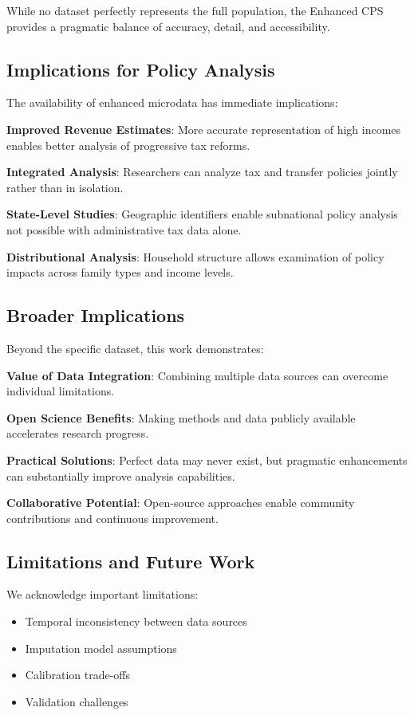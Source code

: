 While no dataset perfectly represents the full population, the Enhanced CPS provides a pragmatic balance of accuracy, detail, and accessibility.

\subsection{Implications for Policy Analysis}

The availability of enhanced microdata has immediate implications:

\textbf{Improved Revenue Estimates}: More accurate representation of high incomes enables better analysis of progressive tax reforms.

\textbf{Integrated Analysis}: Researchers can analyze tax and transfer policies jointly rather than in isolation.

\textbf{State-Level Studies}: Geographic identifiers enable subnational policy analysis not possible with administrative tax data alone.

\textbf{Distributional Analysis}: Household structure allows examination of policy impacts across family types and income levels.

\subsection{Broader Implications}

Beyond the specific dataset, this work demonstrates:

\textbf{Value of Data Integration}: Combining multiple data sources can overcome individual limitations.

\textbf{Open Science Benefits}: Making methods and data publicly available accelerates research progress.

\textbf{Practical Solutions}: Perfect data may never exist, but pragmatic enhancements can substantially improve analysis capabilities.

\textbf{Collaborative Potential}: Open-source approaches enable community contributions and continuous improvement.

\subsection{Limitations and Future Work}

We acknowledge important limitations:
\begin{itemize}
\item Temporal inconsistency between data sources
\item Imputation model assumptions  
\item Calibration trade-offs
\item Validation challenges
\end{itemize}


